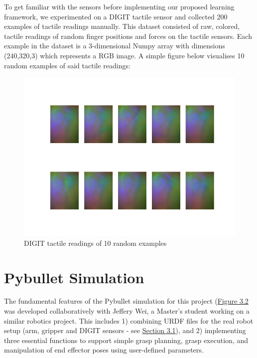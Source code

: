 \documentclass[11pt, a4paper]{report}
\theoremstyle{definition}
\begin{document}
To get familiar with the sensors before implementing our proposed learning framework, we experimented on a DIGIT tactile sensor and collected 200 examples of tactile readings manually. This dataset consisted of raw, colored, tactile readings of random finger positions and forces on the tactile sensors. Each example in the dataset is a 3-dimensional Numpy array with dimensions (240,320,3) which represents a RGB image. A simple figure below visualises 10 random examples of said tactile readings:
\begin{figure}[H]
    \centering
    \includegraphics[scale=0.4]{docs/Project Report/Media/tacto_testing.png}
    \caption{DIGIT tactile readings of 10 random examples}
    \label{fig:digit\_readings}
\end{figure}


\section{Pybullet Simulation}
\label{sec:3.3}
The fundamental features of the Pybullet simulation for this project (\hyperref[fig:pbSimScreenshot]{Figure 3.2} was developed collaboratively with Jeffery Wei, a Master's student working on a similar robotics project. This includes 1) combining URDF files for the real robot setup (arm, gripper and DIGIT sensors - see \hyperref[sec:3.1]{Section 3.1}), and 2) implementing three essential functions to support simple grasp planning, grasp execution, and manipulation of end effector poses using user-defined parameters.
\end{document}
